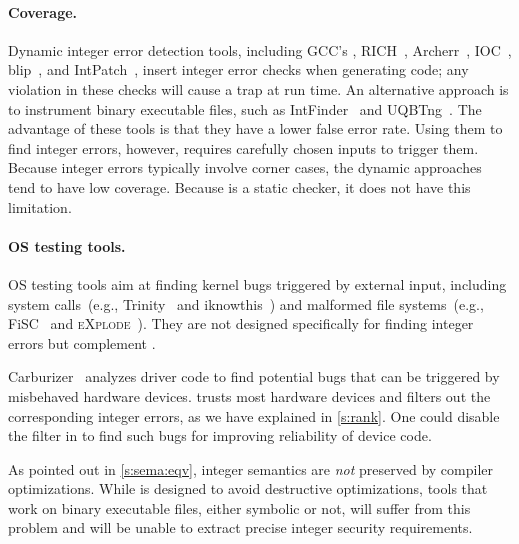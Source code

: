 \paragraph{Coverage.}
Dynamic integer error detection tools,
including
GCC's ,
RICH~\cite{brumley:rich},
Archerr~\cite{archerr},
IOC~\cite{ioc},
blip~\cite{blip},
and
IntPatch~\cite{intpatch},
insert integer error checks when generating code; any violation in
these checks will cause a trap at run time.
%
%
An alternative approach is to instrument binary executable files,
such as IntFinder~\cite{intfinder} and UQBTng~\cite{uqbtng}.
%
The advantage of these tools is that they have a lower false error rate.  Using
them to find integer errors, however, requires carefully chosen inputs to
trigger them.  Because integer errors typically involve corner cases, the
dynamic approaches tend to have low coverage.  Because \sys is a static checker,
it does not have this limitation.

\paragraph{OS testing tools.}
OS testing tools aim at finding kernel bugs triggered by external input,
including system calls~(e.g., Trinity~\cite{trinity} and
iknowthis~\cite{iknowthis}) and malformed file systems~(e.g.,
FiSC~\cite{fisc:yang} and \textsc{eXplode}~\cite{explode:yang}).
They are not designed specifically for finding integer errors
but complement \sys.
\fi

Carburizer~\cite{kadav:tolerating} analyzes driver code to find
potential bugs that can be triggered by misbehaved hardware devices.
\sys trusts most hardware devices and filters out the corresponding
integer errors, as we have explained in \autoref{s:rank}.  One could
disable the filter in \sys to find such bugs for improving reliability
of device code.
\fi

As pointed out in \autoref{s:sema:eqv}, integer semantics
are \emph{not} preserved by compiler optimizations.
While \sys is designed to avoid destructive optimizations, tools that
work on binary executable files, either symbolic or not,
will suffer from this problem and will be unable to extract
precise integer security requirements.
\fi

